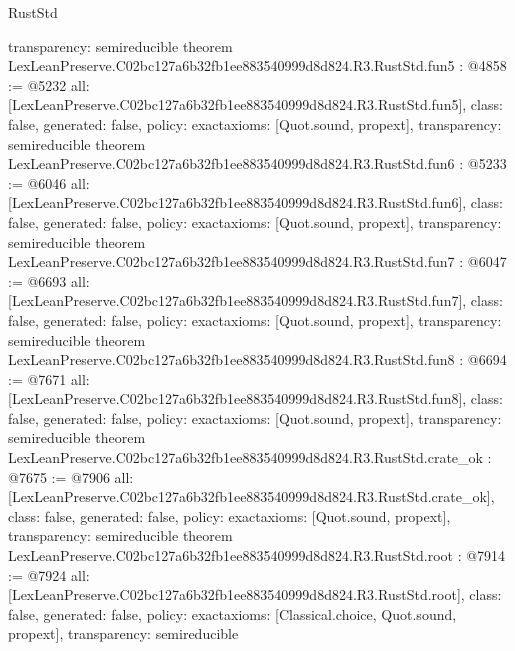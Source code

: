 \begin{lexlean}{RustStd}
\begin{coremodule}
{  transparency: semireducible
}
theorem LexLeanPreserve.C02bc127a6b32fb1ee883540999d8d824.R3.RustStd.fun5 : @4858 := @5232 {
  all: [LexLeanPreserve.C02bc127a6b32fb1ee883540999d8d824.R3.RustStd.fun5],
  class: false,
  generated: false,
  policy: exact{axioms: [Quot.sound, propext]},
  transparency: semireducible
}
theorem LexLeanPreserve.C02bc127a6b32fb1ee883540999d8d824.R3.RustStd.fun6 : @5233 := @6046 {
  all: [LexLeanPreserve.C02bc127a6b32fb1ee883540999d8d824.R3.RustStd.fun6],
  class: false,
  generated: false,
  policy: exact{axioms: [Quot.sound, propext]},
  transparency: semireducible
}
theorem LexLeanPreserve.C02bc127a6b32fb1ee883540999d8d824.R3.RustStd.fun7 : @6047 := @6693 {
  all: [LexLeanPreserve.C02bc127a6b32fb1ee883540999d8d824.R3.RustStd.fun7],
  class: false,
  generated: false,
  policy: exact{axioms: [Quot.sound, propext]},
  transparency: semireducible
}
theorem LexLeanPreserve.C02bc127a6b32fb1ee883540999d8d824.R3.RustStd.fun8 : @6694 := @7671 {
  all: [LexLeanPreserve.C02bc127a6b32fb1ee883540999d8d824.R3.RustStd.fun8],
  class: false,
  generated: false,
  policy: exact{axioms: [Quot.sound, propext]},
  transparency: semireducible
}
theorem LexLeanPreserve.C02bc127a6b32fb1ee883540999d8d824.R3.RustStd.crate_ok : @7675 := @7906 {
  all: [LexLeanPreserve.C02bc127a6b32fb1ee883540999d8d824.R3.RustStd.crate_ok],
  class: false,
  generated: false,
  policy: exact{axioms: [Quot.sound, propext]},
  transparency: semireducible
}
theorem LexLeanPreserve.C02bc127a6b32fb1ee883540999d8d824.R3.RustStd.root : @7914 := @7924 {
  all: [LexLeanPreserve.C02bc127a6b32fb1ee883540999d8d824.R3.RustStd.root],
  class: false,
  generated: false,
  policy: exact{axioms: [Classical.choice, Quot.sound, propext]},
  transparency: semireducible
}


\end{coremodule}
\end{lexlean}
